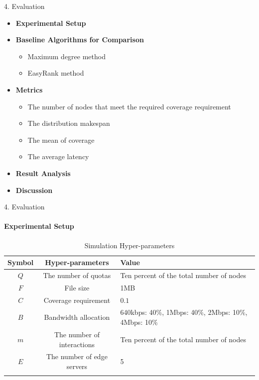 \documentclass{beamer}		%
\begin{document}
\begin{frame}{4. Evaluation}
\begin{itemize}
    \item \textbf{Experimental Setup}
    \item \textbf{Baseline Algorithms for Comparison}
    \begin{itemize}
        \item Maximum degree method
        \item EasyRank method
    \end{itemize}
    \item \textbf{Metrics}
    \begin{itemize}
        \item The number of nodes that meet the required coverage requirement
        \item The distribution makespan
        \item The mean of coverage
        \item The average latency
    \end{itemize}
    \item \textbf{Result Analysis}
    \item \textbf{Discussion}
\end{itemize}
\end{frame}

\begin{frame}{4. Evaluation}
\framesubtitle{Experimental Setup}
\centering
\begin{table}[]
    \centering
    \begin{tabularx}{\textwidth}{c|c|Y}
    \Xhline{1.5pt}
     \textbf{Symbol} & \textbf{Hyper-parameters} & \textbf{Value} \\
     \hline \hline
     $Q$ & The number of quotas & Ten percent of the total number of nodes \\
     \hline
     $F$ & File size & 1MB \\
     \hline
     $C$ & Coverage requirement & $0.1$\\
     \hline
     $B$ & Bandwidth allocation & 640kbps: 40\%, 1Mbps: 40\%, 2Mbps: 10\%, 4Mbps: 10\% \\
     \hline
     $m$ & The number of interactions & Ten percent of the total number of nodes \\
     \hline
     $E$ & The number of edge servers & 5\\
\Xhline{1.5pt}     
\end{tabularx}
\caption{Simulation Hyper-parameters}
\end{table}
\end{frame}
\end{document}
